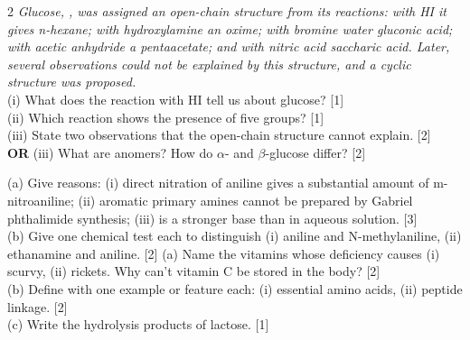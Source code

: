 \documentclass[10pt,a4paper]{extarticle}
\newcommand{\mk}[1]{{\scriptsize\color{black!55}[#1]}}
\begin{document}
\begin{multicols}{2}
\Q \textit{Glucose, , was assigned an open-chain structure from its reactions: with HI it gives n-hexane; with hydroxylamine an oxime; with bromine water gluconic acid; with acetic anhydride a pentaacetate; and with nitric acid saccharic acid. Later, several observations could not be explained by this structure, and a cyclic structure was proposed.}\\[2pt]
(i) What does the reaction with HI tell us about glucose? \mk{1}\\
(ii) Which reaction shows the presence of five  groups? \mk{1}\\
(iii) State two observations that the open-chain structure cannot explain. \mk{2}\\
\textbf{OR} (iii) What are anomers? How do $\alpha$- and $\beta$-glucose differ? \mk{2}

\Q (a) Give reasons: (i) direct nitration of aniline gives a substantial amount of m-nitroaniline; (ii) aromatic primary amines cannot be prepared by Gabriel phthalimide synthesis; (iii)  is a stronger base than  in aqueous solution. \mk{3}\\
(b) Give one chemical test each to distinguish (i) aniline and N-methylaniline, (ii) ethanamine and aniline. \mk{2}
\Q (a) Name the vitamins whose deficiency causes (i) scurvy, (ii) rickets. Why can't vitamin C be stored in the body? \mk{2}\\
(b) Define with one example or feature each: (i) essential amino acids, (ii) peptide linkage. \mk{2}\\
(c) Write the hydrolysis products of lactose. \mk{1}
\end{multicols}
\end{document}
